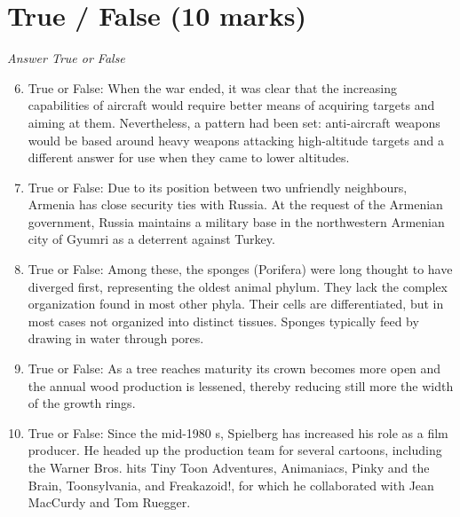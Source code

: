 \documentclass[12pt]{article}
\begin{document}
\section*{True / False (10 marks)}
\textit{Answer True or False}
\begin{enumerate}[label=\arabic*.]
\setcounter{enumi}{5}
\item True or False: When the war ended, it was clear that the increasing capabilities of aircraft would require better means of acquiring targets and aiming at them. Nevertheless, a pattern had been set: anti-aircraft weapons would be based around heavy weapons attacking high-altitude targets and a different answer for use when they came to lower altitudes.
\item True or False: Due to its position between two unfriendly neighbours, Armenia has close security ties with Russia. At the request of the Armenian government, Russia maintains a military base in the northwestern Armenian city of Gyumri as a deterrent against Turkey.
\item True or False: Among these, the sponges (Porifera) were long thought to have diverged first, representing the oldest animal phylum. They lack the complex organization found in most other phyla. Their cells are differentiated, but in most cases not organized into distinct tissues. Sponges typically feed by drawing in water through pores.
\item True or False: As a tree reaches maturity its crown becomes more open and the annual wood production is lessened, thereby reducing still more the width of the growth rings.
\item True or False: Since the mid-1980 s, Spielberg has increased his role as a film producer. He headed up the production team for several cartoons, including the Warner Bros. hits Tiny Toon Adventures, Animaniacs, Pinky and the Brain, Toonsylvania, and Freakazoid!, for which he collaborated with Jean MacCurdy and Tom Ruegger.
\end{enumerate}
\end{document}
